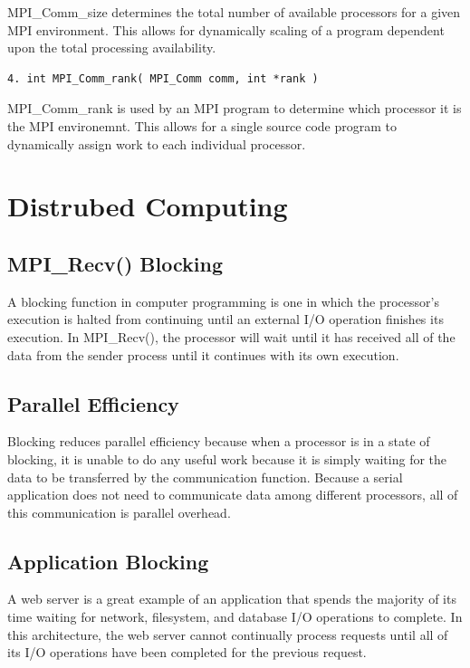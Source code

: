 \documentclass[12pt, letterpaper]{report}
\begin{document}
MPI\_Comm\_size determines the total number of available processors for a given MPI environment. This allows for dynamically scaling of a program dependent upon the total processing availability.

\begin{verbatim}
4. int MPI_Comm_rank( MPI_Comm comm, int *rank )
\end{verbatim}

MPI\_Comm\_rank is used by an MPI program to determine which processor it is the MPI environemnt. This allows for a single source code program to dynamically assign work to each individual processor.

\section{Distrubed Computing}

\subsection{MPI\_Recv() Blocking}

A blocking function in computer programming is one in which the processor's execution is halted from continuing until an external I/O operation finishes its execution. In MPI\_Recv(), the processor will wait until it has received all of the data from the sender process until it continues with its own execution.

\subsection{Parallel Efficiency}

Blocking reduces parallel efficiency because when a processor is in a state of blocking, it is unable to do any useful work because it is simply waiting for the data to be transferred by the communication function. Because a serial application does not need to communicate data among different processors, all of this communication is parallel overhead.

\subsection{Application Blocking}

A web server is a great example of an application that spends the majority of its time waiting for network, filesystem, and database I/O operations to complete. In this architecture, the web server cannot continually process requests until all of its I/O operations have been completed for the previous request.
\end{document}
